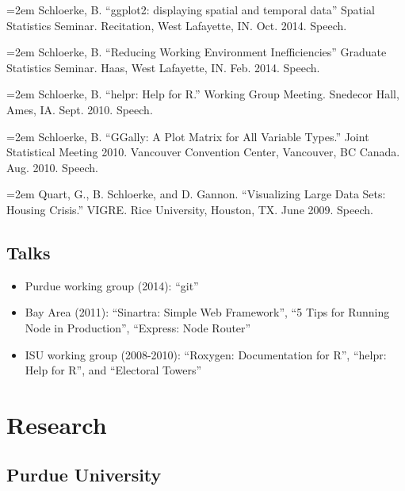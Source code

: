 \documentclass[oneside]{article}
\begin{document}
    \hangindent=2em
    Schloerke, B. ``ggplot2: displaying spatial and temporal data'' Spatial Statistics Seminar. Recitation, West Lafayette, IN. Oct. 2014. Speech.

    \hangindent=2em
    Schloerke, B. ``Reducing Working Environment Inefficiencies'' Graduate Statistics Seminar. Haas, West Lafayette, IN. Feb. 2014. Speech.



    \hangindent=2em
    Schloerke, B. ``helpr: Help for R.'' Working Group Meeting. Snedecor Hall, Ames, IA. Sept. 2010. Speech.
  
    \hangindent=2em
    Schloerke, B. ``GGally: A Plot Matrix for All Variable Types.'' Joint Statistical Meeting 2010. Vancouver  Convention Center, Vancouver, BC Canada. Aug. 2010. Speech.
  
  
    \hangindent=2em
    Quart, G., B. Schloerke, and D. Gannon. ``Visualizing Large Data Sets: Housing Crisis.'' VIGRE. Rice  University, Houston, TX. June 2009. Speech.
  
  \subsection{Talks}
    \begin{itemize}
      \item Purdue working group (2014): ``git''
      \item Bay Area (2011): ``Sinartra: Simple Web Framework'', ``5 Tips for Running Node in Production'',
  ``Express: Node Router''
      \item ISU working group (2008-2010): ``Roxygen: Documentation for R'', ``helpr: Help for R'', and ``Electoral Towers''
    \end{itemize}
  

\section{Research}

\subsection{Purdue University}
\end{document}
